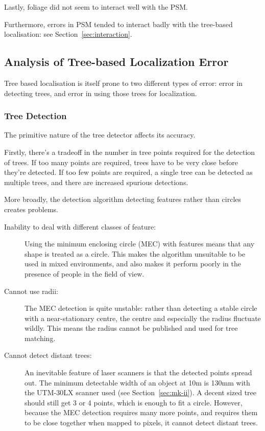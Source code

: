 \documentclass[12pt,oneside,a4paper]{book}
\begin{document}
Lastly, foliage did not seem to interact well with the PSM.

Furthermore, errors in PSM tended to interact badly with the
tree-based localisation: see Section~\ref{sec:interaction}.

\subsection{Analysis of Tree-based Localization Error}
\label{sec:tree-error}

Tree based localisation is itself prone to two different types of
error: error in detecting trees, and error in using those trees for
localization.

\subsubsection{Tree Detection}
\label{sec:tree-detection}

The primitive nature of the tree detector affects its accuracy. 

Firstly, there's a tradeoff in the number in tree points required for
the detection of trees. If too many points are required, trees have to be very
close before they're detected. If too few points are required, a
single tree can be detected as multiple trees, and there are increased spurious detections.

More broadly, the detection algorithm detecting features rather than
circles creates problems.

\begin{description}
\item[Inability to deal with different classes of feature:] Using the
  minimum enclosing circle (MEC) with features means that any shape is
  treated as a circle. This makes the algorithm unsuitable to be used
  in mixed environments, and also makes it perform poorly in the
  presence of people in the field of view.
\item[Cannot use radii:] The MEC detection is quite unstable: rather
  than detecting a stable circle with a near-stationary centre, the
  centre and especially the radius fluctuate wildly. This means the
  radius cannot be published and used for tree matching.
\item[Cannot detect distant trees:] An inevitable feature of laser
  scanners is that the detected points spread out. The minimum
  detectable width of an object at 10m is 130mm with the UTM-30LX
  scanner used (see Section~\ref{sec:mk-ii}). A decent sized tree
  should still get 3 or 4 points, which is enough to fit a
  circle. However, because the MEC detection requires many more
  points, and requires them to be close together when mapped to
  pixels, it cannot detect distant trees.
\end{description}
\end{document}
